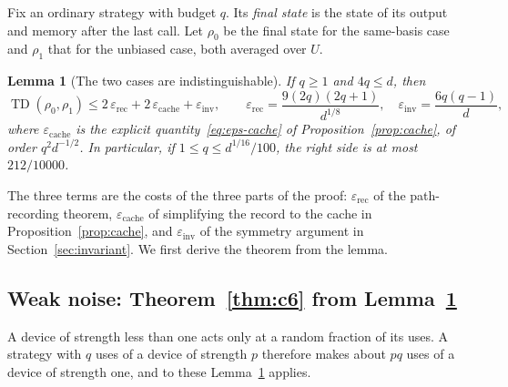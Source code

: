 \documentclass[11pt,letterpaper]{article}
\newtheorem{lemma}[theorem]{Lemma}
\theoremstyle{definition}\newtheorem{definition}[theorem]{Definition}
\newcommand{\TD}{\operatorname{TD}}
\begin{document}
Fix an ordinary strategy with budget $q$. Its \emph{final state} is
the state of its output and memory after the last call. Let $\rho_0$
be the final state for the same-basis case and $\rho_1$ that for the
unbiased case, both averaged over $U$.

\begin{lemma}[The two cases are indistinguishable]\label{lem:c6-comparison}
If $q\ge1$ and $4q\le d$, then
\begin{equation}\label{eq:c6-comparison}
 \TD(\rho_0,\rho_1)\le
 2\,\varepsilon_{\mathrm{rec}}+2\,\varepsilon_{\mathrm{cache}}
 +\varepsilon_{\mathrm{inv}},
 \qquad
 \varepsilon_{\mathrm{rec}}=\frac{9(2q)(2q+1)}{d^{1/8}},\quad
 \varepsilon_{\mathrm{inv}}=\frac{6q(q-1)}d,
\end{equation}
where $\varepsilon_{\mathrm{cache}}$ is the explicit
quantity~\eqref{eq:eps-cache} of Proposition~\ref{prop:cache}, of order
$q^2d^{-1/2}$. In particular, if $1\le q\le d^{1/16}/100$, the right
side is at most $212/10000$.
\end{lemma}

The three terms are the costs of the three parts of the proof:
$\varepsilon_{\mathrm{rec}}$ of the path-recording theorem,
$\varepsilon_{\mathrm{cache}}$ of simplifying the record to the cache
in Proposition~\ref{prop:cache}, and $\varepsilon_{\mathrm{inv}}$ of
the symmetry argument in Section~\ref{sec:invariant}. We first derive
the theorem from the lemma.

\subsection{Weak noise: Theorem~\ref{thm:c6} from Lemma~\ref{lem:c6-comparison}}\label{sec:validation}

A device of strength less than one acts only at a random fraction of
its uses. A strategy with $q$ uses of a device of strength $p$
therefore makes about $pq$ uses of a device of strength one, and to
these Lemma~\ref{lem:c6-comparison} applies.
\end{document}

